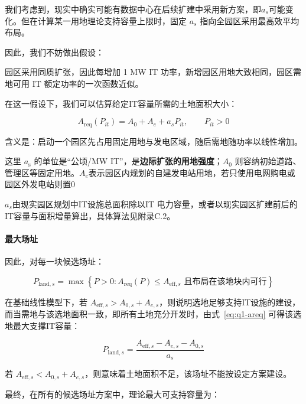 我们考虑到，现实中确实可能有数据中心在后续扩建中采用新方案，即$a_s$可能变化。但在计算某一用地理论支持容量上限时，固定 $a_s$ 指向全园区采用最高效平均布局。

因此，我们不妨做出假设：

\begin{asum}\label{asum:homogeneous}
园区采用同质扩张，因此每增加 1 MW IT 功率，新增园区用地大致相同，园区需地可用 IT 额定功率的一次函数近似。
\end{asum}

在这一假设下，我们可以估算给定IT容量所需的土地面积大小：

\begin{equation}\label{eq:q1-areq}
A_{\mathrm{req}}(P_{it})=A_{0}+A_{e}+a_sP_{it},\qquad P_{it}>0
\end{equation}

含义是：启动一个园区先占用固定用地与发电区域，随后需地随功率以线性增加。

这里 $a_{\text{s}}$ 的单位是“公顷/MW IT”，是\textbf{边际扩张的用地强度}；$A_0$ 则容纳初始道路、管理区等固定用地。$A_e$表示园区内规划的自建发电站用地，若只使用电网购电或园区外发电站则置$0$

$a_s$由现实园区规划中IT设施总面积除以IT 电力容量，或者以现实园区扩建前后的IT容量与面积增量算出，具体算法见附录C.2。

\paragraph{最大场址}\label{sec:land-max}

因此，对每一块候选场址：

\begin{equation}\label{eq:q1-pland}
P_{\mathrm{land},s}=\max\left\{P>0:A_{\mathrm{req}}(P)\leq A_{\mathrm{eff},s}\text{ 且布局在该地块内可行}\right\}
\end{equation}

在基础线性模型下，若 $A_{\mathrm{eff},s}>A_{0,s}+A_{e,s}$，则说明选地足够支持IT设施的建设，而当需地与该选地面积一致，即所有土地充分开发时，由式~\eqref{eq:q1-areq} 可得该选地最大支撑IT容量：

\begin{equation}\label{eq:q1-pland-linear}
P_{\mathrm{land},s} =\frac{A_{\mathrm{eff},s}-A_{e,s}-A_{0,s}}{a_s}
\end{equation}

若 $A_{\mathrm{eff},s}<A_{0,s}+A_{e,s}$，则意味着土地面积不足，该场址不能按设定方案建设。

最终，在所有的候选场址方案中，理论最大可支持容量为：

